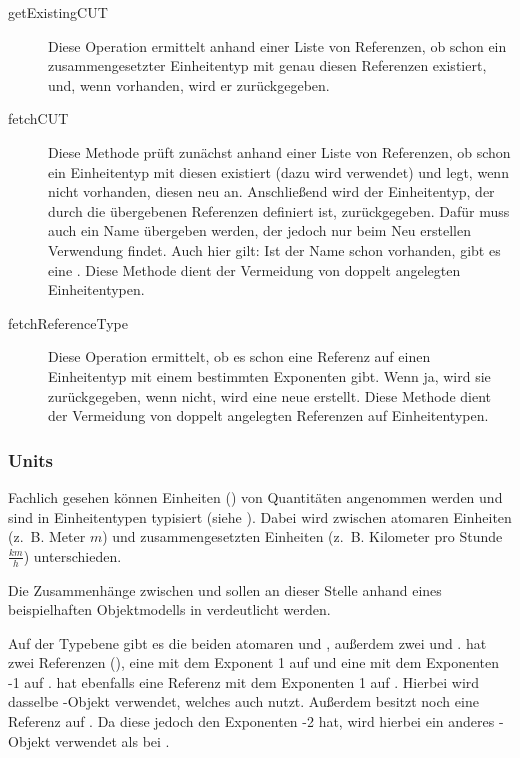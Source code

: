 \begin{description}
\item[getExistingCUT]
Diese Operation ermittelt anhand einer Liste von Referenzen, ob schon ein zusammengesetzter Einheitentyp mit genau diesen Referenzen existiert, und, wenn vorhanden, wird er zurückgegeben. 
\item[fetchCUT]
Diese Methode prüft zunächst anhand einer Liste von Referenzen, ob schon ein Einheitentyp mit diesen existiert (dazu wird  verwendet) und legt, wenn nicht vorhanden, diesen neu an. Anschließend wird der Einheitentyp, der durch die übergebenen Referenzen definiert ist, zurückgegeben. Dafür muss auch ein Name übergeben werden, der jedoch nur beim Neu erstellen Verwendung findet. Auch hier gilt: Ist der Name schon vorhanden, gibt es eine . Diese Methode dient der Vermeidung von doppelt angelegten Einheitentypen.
\item[fetchReferenceType]
Diese Operation ermittelt, ob es schon eine Referenz auf einen Einheitentyp mit einem bestimmten Exponenten gibt. Wenn ja, wird sie zurückgegeben, wenn nicht, wird eine neue erstellt. Diese Methode dient der Vermeidung von doppelt angelegten Referenzen auf Einheitentypen.
\end{description}


\subsubsection{Units}
Fachlich gesehen können Einheiten () von Quantitäten angenommen werden und sind in Einheitentypen typisiert (siehe ).
Dabei wird zwischen atomaren Einheiten (z.~B. Meter $m$) und zusammengesetzten Einheiten (z.~B. Kilometer pro Stunde $\frac{km}{h}$) unterschieden.


Die Zusammenhänge zwischen  und  sollen an dieser Stelle anhand eines beispielhaften Objektmodells in  verdeutlicht werden.


Auf der Typebene gibt es die beiden atomaren   und , 
außerdem zwei   und . 
 hat zwei Referenzen (), eine mit dem Exponent 1 auf  und eine mit dem Exponenten -1 auf . 
 hat ebenfalls eine Referenz mit dem Exponenten 1 auf . 
Hierbei wird dasselbe -Objekt verwendet, welches auch  nutzt. 
Außerdem besitzt  noch eine Referenz auf . 
Da diese jedoch den Exponenten -2 hat, wird hierbei ein anderes -Objekt verwendet als bei .

